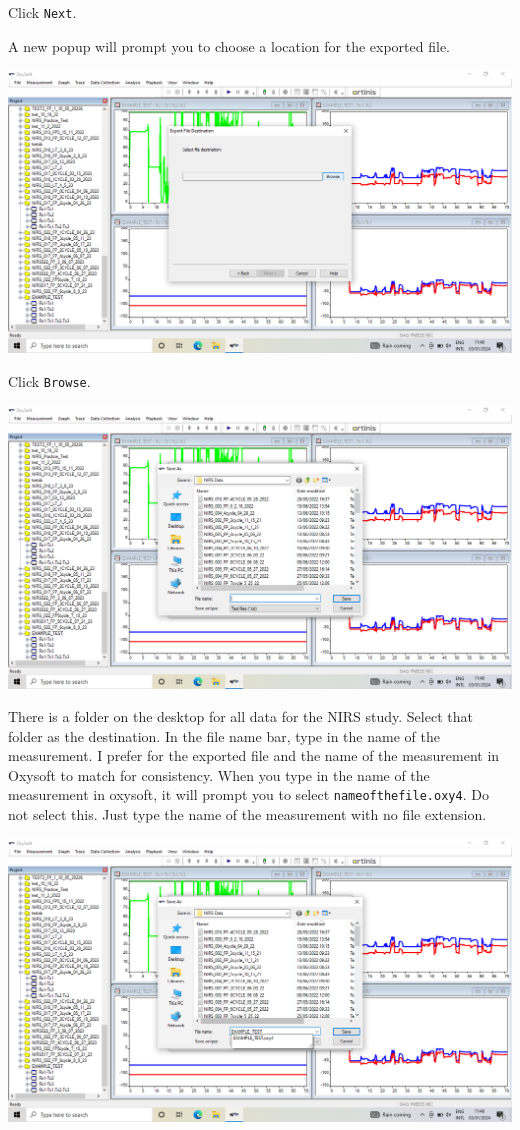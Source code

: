 \documentclass[
]{book}
\begin{document}
Click \texttt{Next}.

A new popup will prompt you to choose a location for the exported file.

\includegraphics[width=1\linewidth]{images/exportmeasurement/3_choosefilelocation}

Click \texttt{Browse}.

\includegraphics[width=1\linewidth]{images/exportmeasurement/4_filelocationpopup}

There is a folder on the desktop for all data for the NIRS study. Select that folder as the destination. In the file name bar, type in the name of the measurement. I prefer for the exported file and the name of the measurement in Oxysoft to match for consistency. When you type in the name of the measurement in oxysoft, it will prompt you to select \texttt{nameofthefile.oxy4}. Do not select this. Just type the name of the measurement with no file extension.

\includegraphics[width=1\linewidth]{images/exportmeasurement/5_nameexportfile}
\end{document}
